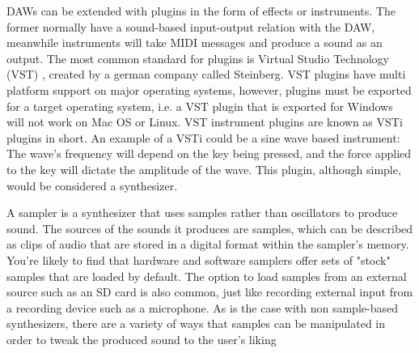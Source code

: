 \documentclass[12pt, a4paper, hidelinks]{report}
\begin{document}
	DAWs can be extended with plugins in the form of effects or instruments. The former normally have a sound-based input-output relation with the DAW, meanwhile instruments will take MIDI messages and produce a sound as an output. The most common standard for plugins is Virtual Studio Technology (VST) \cite{vst}, created by a german company called Steinberg. VST plugins have multi platform support on major operating systems, however, plugins must be exported for a target operating system, i.e. a VST plugin that is exported for Windows will not work on Mac OS or Linux. VST instrument plugins are known as VSTi plugins in short. An example of a VSTi could be a sine wave based instrument: The wave's frequency will depend on the key being pressed, and the force applied to the key will dictate the amplitude of the wave. This plugin, although simple, would be considered a synthesizer. \par 
	A sampler is a synthesizer that uses samples rather than oscillators to produce sound.  The sources of the sounds it produces are samples, which can be described as clips of audio that are stored in a digital format within the sampler's memory. You're likely to find that hardware and software samplers offer sets of "stock" samples that are loaded by default. The option to load samples from an external source such as an SD card is also common, just like recording external input from a recording device such as a microphone. As is the case with non sample-based synthesizers, there are a variety of ways that samples can be manipulated in order to tweak the produced sound to the user's liking\par
	
\end{document}
